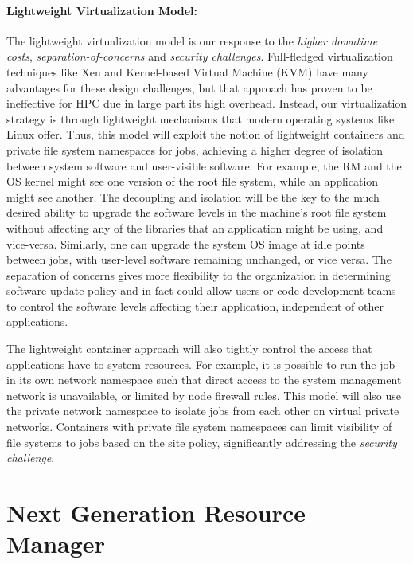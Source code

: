 \documentclass[10pt]{article}
\begin{document}
\paragraph{Lightweight Virtualization Model:}
The lightweight virtualization model is our response to 
the {\sl higher downtime costs}, {\sl separation-of-concerns} and
{\sl security challenges}. Full-fledged virtualization techniques like Xen and
Kernel-based Virtual Machine (KVM) have many advantages for these design challenges, but
that approach has proven to be ineffective for HPC due in large part
its high overhead. Instead, our virtualization strategy is through lightweight
mechanisms that modern operating systems like Linux offer.  Thus,
this model will exploit the notion of lightweight containers and private
file system namespaces for jobs, achieving a higher degree of isolation
between system software and user-visible software. For example, the RM
and the OS kernel might see one version of the root file system, while
an application might see another. The decoupling and isolation will be
the key to the much desired ability to upgrade the software levels in the
machine's root file system without affecting any of the libraries that
an application might be using, and vice-versa. Similarly, one can upgrade
the system OS image at idle points between jobs, with user-level software
remaining unchanged, or vice versa. The separation of concerns gives more
flexibility to the organization in determining software update policy
and in fact could allow users or code development teams to control the
software levels affecting their application, independent of other
applications.


The lightweight container approach will also tightly control the access
that applications have to system resources. For example, it is possible to
run the job in its own network namespace such that direct access to the
system management network is unavailable, or limited by node firewall
rules. This model will  also use the private network namespace to isolate
jobs from each other on virtual private networks.
Containers with private file system namespaces can limit visibility of
file systems to jobs based on the site policy, significantly addressing
the {\sl security challenge}.


\section{Next Generation Resource Manager}
\label{sect:ngrm}
\end{document}

